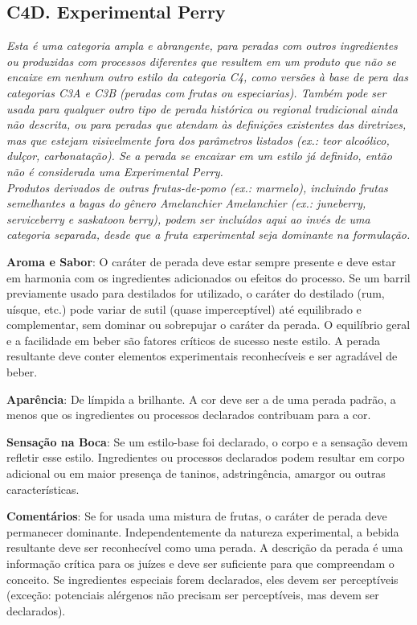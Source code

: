 \subsection*{C4D. Experimental Perry}

\textit{Esta é uma categoria ampla e abrangente, para peradas com outros ingredientes ou produzidas com processos diferentes que resultem em um produto que não se encaixe em nenhum outro estilo da categoria C4, como versões à base de pera das categorias C3A e C3B (peradas com frutas ou especiarias). Também pode ser usada para qualquer outro tipo de perada histórica ou regional tradicional ainda não descrita, ou para peradas que atendam às definições existentes das diretrizes, mas que estejam visivelmente fora dos parâmetros listados (ex.: teor alcoólico, dulçor, carbonatação). Se a perada se encaixar em um estilo já definido, então não é considerada uma Experimental Perry.} \\
\textit{Produtos derivados de outras frutas-de-pomo (ex.: marmelo), incluindo frutas semelhantes a bagas do gênero Amelanchier \textit{Amelanchier} (ex.: \textit{juneberry}, \textit{serviceberry} e \textit{saskatoon berry}), podem ser incluídos aqui ao invés de uma categoria separada, desde que a fruta experimental seja dominante na formulação.}

\textbf{Aroma e Sabor}: O caráter de perada deve estar sempre presente e deve estar em harmonia com os ingredientes adicionados ou efeitos do processo. Se um barril previamente usado para destilados for utilizado, o caráter do destilado (rum, uísque, etc.) pode variar de sutil (quase imperceptível) até equilibrado e complementar, sem dominar ou sobrepujar o caráter da perada. O equilíbrio geral e a facilidade em beber são fatores críticos de sucesso neste estilo. A perada resultante deve conter elementos experimentais reconhecíveis e ser agradável de beber.

\textbf{Aparência}: De límpida a brilhante. A cor deve ser a de uma perada padrão, a menos que os ingredientes ou processos declarados contribuam para a cor.

\textbf{Sensação na Boca}: Se um estilo-base foi declarado, o corpo e a sensação devem refletir esse estilo. Ingredientes ou processos declarados podem resultar em corpo adicional ou em maior presença de taninos, adstringência, amargor ou outras características.

\textbf{Comentários}: Se for usada uma mistura de frutas, o caráter de perada deve permanecer dominante. Independentemente da natureza experimental, a bebida resultante deve ser reconhecível como uma perada. A descrição da perada é uma informação crítica para os juízes e deve ser suficiente para que compreendam o conceito. Se ingredientes especiais forem declarados, eles devem ser perceptíveis (exceção: potenciais alérgenos não precisam ser perceptíveis, mas devem ser declarados).

